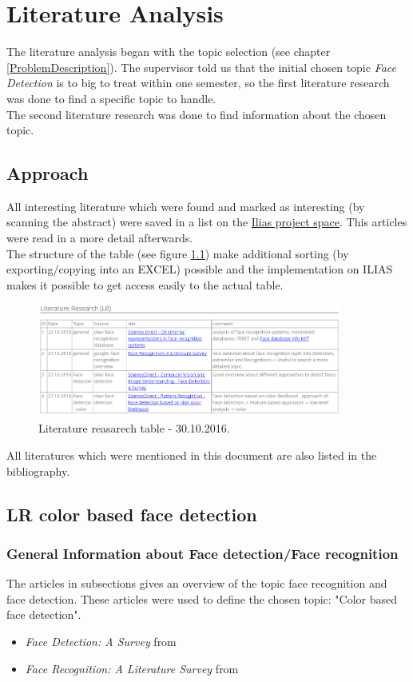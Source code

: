 \documentclass[Bachelorarbeit.tex]{subfiles}
\begin{document}
\chapter{Literature Analysis}
The literature analysis began with the topic selection (see chapter \ref{ProblemDescription}). The supervisor told us that the initial chosen topic \textit{Face Detection} is to big to treat within one semester, so the first literature research was done to find a specific topic to handle.\\
The second literature research was done to find information about the chosen topic.
\section{Approach}
All interesting literature which were found and marked as interesting (by scanning the abstract) were saved in a list on the \href{https://ilias.fhv.at/goto.php?target=wiki_298249_Literature_Research_%28LR%29}{Ilias project space}. This articles were read in a more detail afterwards.\\
The structure of the table (see figure \ref{LRT})  make additional sorting (by exporting/copying into an EXCEL) possible and the implementation on ILIAS makes it possible to get access easily to the actual table.

\begin{figure}[!h] %
\centering
\includegraphics[width=10cm]{./pictures/LR_20161030}
\caption{Literature reasarech table - 30.10.2016. \label{LRT}}
\end{figure}

All literatures which were mentioned in this document are also listed in the bibliography.

\section{LR color based face detection}
\subsection{General Information about Face detection/Face recognition}
The articles in subsections gives an overview of the topic face recognition and face detection. These articles were used to define the chosen topic: "Color based face detection".
\begin{itemize}
\item \textit{Face Detection: A Survey} from \cite{FDASurvey} 
\item \textit{Face Recognition: A Literature Survey} from \cite{FRLiteratureSurvey}    
\end{itemize}
\end{document}
